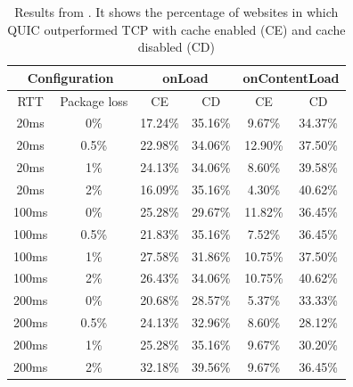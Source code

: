\documentclass[conference]{IEEEtran}
\begin{document}
\begin{table}
\begin{center}
\begin{tabular}{|cc|cc|cc|}
\hline

\multicolumn{2}{|c|}{\textbf{Configuration}} & 
\multicolumn{2}{|c|}{\textbf{onLoad}} & 
\multicolumn{2}{|c|}{\textbf{onContentLoad}} \\
\hline

RTT & Package loss & CE & CD & CE & CD \\
\hline

20ms  & 0\%   & 17.24\% & 35.16\% & 9.67\%  & 34.37\% \\
20ms  & 0.5\% & 22.98\% & 34.06\% & 12.90\% & 37.50\% \\
20ms  & 1\%   & 24.13\% & 34.06\% & 8.60\%  & 39.58\% \\
20ms  & 2\%   & 16.09\% & 35.16\% & 4.30\%  & 40.62\% \\
100ms & 0\%   & 25.28\% & 29.67\% & 11.82\% & 36.45\% \\
100ms & 0.5\% & 21.83\% & 35.16\% & 7.52\%  & 36.45\% \\
100ms & 1\%   & 27.58\% & 31.86\% & 10.75\% & 37.50\% \\
100ms & 2\%   & 26.43\% & 34.06\% & 10.75\% & 40.62\% \\
200ms & 0\%   & 20.68\% & 28.57\% & 5.37\%  & 33.33\% \\
200ms & 0.5\% & 24.13\% & 32.96\% & 8.60\%  & 28.12\% \\
200ms & 1\%   & 25.28\% & 35.16\% & 9.67\%  & 30.20\% \\
200ms & 2\%   & 32.18\% & 39.56\% & 9.67\%  & 36.45\% \\
\hline

\end{tabular}
\end{center}

\label{table:results-nepomuceno}
\caption{Results from \cite{Nepomuceno}. It shows the percentage of websites in which QUIC outperformed TCP with cache enabled (CE) and cache disabled (CD)}
\end{table}



\end{document}
